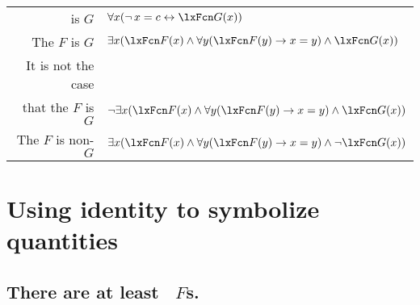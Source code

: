 \begin{center}
\begin{tabular*}{\textwidth}{rl}
 is $G$ & $\forall x(\enot\, {x = c} \eiff \atom{G}{x} )$\\
The $F$ is $G$ & $\exists x(\atom{F}{x} \eand \forall y(\atom{F}{y} \eif x=y) \eand \atom{G}{x} )$\\
It is not the case \\ that
 the $F$ is $G$ & $\enot\exists x(\atom{F}{x} \eand \forall y(\atom{F}{y} \eif x=y) \eand \atom{G}{x} )$\\
The $F$ is non-$G$ & $\exists x(\atom{F}{x} \eand \forall y(\atom{F}{y} \eif x=y) \eand \enot \atom{G}{x} )$
\end{tabular*}
\end{center}







\newpage
\section{Using identity to symbolize quantities}

\subsection*{There are at least \blank\ $F$s.}
\label{summary.atleast}



